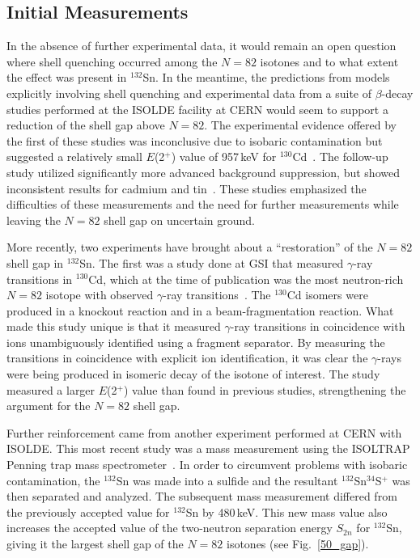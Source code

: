 \subsection{Initial Measurements}
In the absence of further experimental data, it would remain an open question where shell quenching occurred among the $N=82$ isotones and to what extent the effect was present in $^{132}$Sn.  In the meantime, the predictions from models explicitly involving shell quenching and experimental data from a suite of $\beta$-decay studies performed at the ISOLDE facility at CERN would seem to support a reduction of the shell gap above $N=82$.  The experimental evidence offered by the first of these studies was inconclusive due to isobaric contamination but suggested a relatively small $E$(2$^+$) value of 957\,keV for $^{130}$Cd~\cite{Kautzsch_2000}.  The follow-up study utilized significantly more advanced background suppression, but showed inconsistent results for cadmium and tin~\cite{Dillmann_2003}.  These studies emphasized the difficulties of these measurements and the need for further measurements while leaving the $N=82$ shell gap on uncertain ground.

More recently, two experiments have brought about a ``restoration'' of the $N=82$ shell gap in $^{132}$Sn.  The first was a study done at GSI that measured $\gamma$-ray transitions in $^{130}$Cd, which at the time of publication was the most neutron-rich $N=82$ isotope with observed  $\gamma$-ray transitions~\cite{Jungclaus_2007}.  The $^{130}$Cd isomers were produced in a knockout reaction and in a beam-fragmentation reaction.  What made this study unique is that it measured $\gamma$-ray transitions in coincidence with ions unambiguously identified using a fragment separator.  By measuring the transitions in coincidence with explicit ion identification, it was clear the $\gamma$-rays were being produced in isomeric decay of the isotone of interest.  The study measured a larger $E$(2$^+$) value than found in previous studies, strengthening the argument for the $N=82$ shell gap.  

Further reinforcement came from another experiment performed at CERN with ISOLDE.  This most recent study was a mass measurement using the ISOLTRAP Penning trap mass spectrometer~\cite{Dworschak_2008}.  In order to circumvent problems with isobaric contamination, the $^{132}$Sn was made into a sulfide and the resultant $^{132}$Sn$^{34}$S$^+$ was then separated and analyzed.  The subsequent mass measurement differed from the previously accepted value for $^{132}$Sn by 480\,keV.  This new mass value also increases the accepted value of the two-neutron separation energy $S_{2n}$ for $^{132}$Sn, giving it the largest shell gap of the $N=82$ isotones (see Fig.~\ref{50_gap}).

